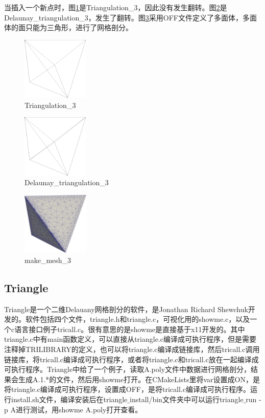 当插入一个新点时，图\ref{fig:1-5}是Triangulation\_3，因此没有发生翻转。图\ref{fig:1-6}是Delaunay\_triangulation\_3，发生了翻转。图\ref{fig:1-7}采用OFF文件定义了多面体，多面体的面只能为三角形，进行了网格剖分。
\begin{figure}[!htbp]
  \centering
  \includegraphics[height=3cm]{fig/1/5.png}
  \caption{Triangulation\_3}
  \label{fig:1-5}
\end{figure}
\begin{figure}[!htbp]
  \centering
  \includegraphics[height=3cm]{fig/1/6.png}
  \caption{Delaunay\_triangulation\_3}
  \label{fig:1-6}
\end{figure}
\begin{figure}[!htbp]
  \centering
  \includegraphics[height=3cm]{fig/1/7.png}
  \caption{make\_mesh\_3}
  \label{fig:1-7}
\end{figure}


\subsection{Triangle}

Triangle是一个二维Delauany网格剖分的软件，是Jonathan Richard Shewchuk开发的。软件包括四个文件，triangle.h和triangle.c，可视化用的showme.c，以及一个c语言接口例子tricall.c。很有意思的是showme是直接基于x11开发的。其中triangle.c中有main函数定义，可以直接从triangle.c编译成可执行程序，但是需要注释掉TRILIBRARY的定义，也可以将triangle.c编译成链接库，然后tricall.c调用链接库，将tricall.c编译成可执行程序，或者将triangle.c和tricall.c放在一起编译成可执行程序。Triangle中给了一个例子，读取A.poly文件中数据进行网格剖分，结果会生成A.1.*的文件，然后用showme打开。在CMakeLists里将var设置成ON，是将triangle.c编译成可执行程序，设置成OFF，是将tricall.c编译成可执行程序。运行install.sh文件，编译安装后在triangle$\_$install/bin文件夹中可以运行triangle$\_$run -p A进行测试，用showme A.poly打开查看。


